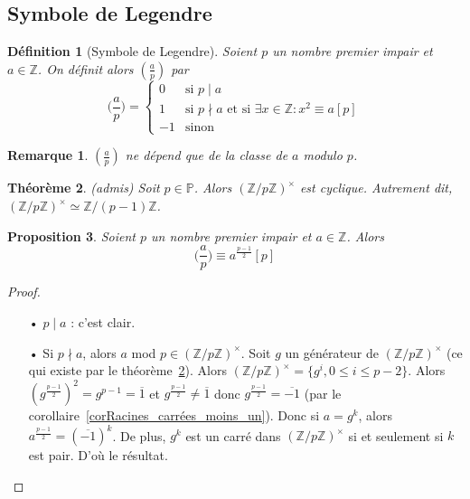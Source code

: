 \documentclass[12pt]{report}
\newtheorem{thm}{Théorème}[chapter]
\newtheorem*{rem}{Remarque}
\newtheorem{Def}[thm]{Définition}
\newtheorem{Prop}[thm]{Proposition}
\newcommand{\Z}{\mathbb{Z}}
\begin{document}
\subsection{Symbole de Legendre}

\begin{Def}[Symbole de Legendre]
Soient $p$ un nombre premier impair et $a \in \mathbb{Z}$. On définit alors $(\tfrac{a}{p})$ par
\begin{equation*}
\Big( \frac{a}{p} \Big)= \left \{  \begin{array}{cl}
0 & \text{si }p\mid a \\
1 & \text{si }p \nmid a \text{ et  si }\exists x \in \mathbb{Z}: x^2 \equiv a [p]\\
-1 & \text{sinon}
\end{array}\right.
\end{equation*}
\end{Def}

\begin{rem}
$(\tfrac{a}{p})$ ne dépend que de la classe de $a$ modulo $p$.
\end{rem}

\begin{thm}\label{thmStructure_Z_pZ_times}(admis)
Soit $p\in \mathbb{P}$. Alors $(\Z/p\Z)^\times$ est cyclique. Autrement dit, $(\Z/p\Z)^\times \simeq \Z/(p-1)\Z$.
\end{thm}

\begin{Prop}
Soient $p$ un nombre premier impair et $a \in \mathbb{Z}$. Alors
\begin{equation*}
\Big( \frac{a}{p} \Big) \equiv a^{\tfrac{p-1}{2}}[p]
\end{equation*}
\end{Prop}

\begin{proof}\
\begin{itemize}
\item[•]$p \mid a$ : c'est clair.
\item[•] Si $p \nmid a$, alors $a$ mod $p \in (\mathbb{Z}/p\mathbb{Z})^{\times}$. Soit $g$ un générateur de $(\Z/p\Z)^\times$ (ce qui existe par le théorème~\ref{thmStructure_Z_pZ_times}). Alors $(\mathbb{Z}/p\mathbb{Z})^{\times}= \{ g^i, 0 \leq i \leq p-2 \}$. Alors  $(g^{\tfrac{p-1}{2}})^2=g^{p-1}=\overline{1}$ et $g^{\tfrac{p-1}{2}}\neq \overline{1}$ donc $g^{\tfrac{p-1}{2}}=\overline{-1}$ (par le corollaire~\ref{corRacines_carrées_moins_un}). Donc si $a=g^k$, alors $a^{\tfrac{p-1}{2}}=(\overline{-1})^{k}$. De plus, $g^k$ est un carré dans $(\mathbb{Z}/p\mathbb{Z})^{\times}$ si et seulement si $k$ est pair. D'où le résultat.
\end{itemize}
\end{proof}
\end{document}
